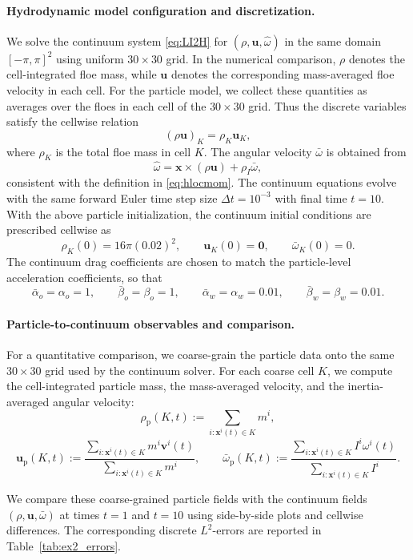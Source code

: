 \documentclass[a4paper,11pt]{article}
\numberwithin{equation}{section}
\theoremstyle{definition}
\newcommand{\bfx}{\boldsymbol{x}}
\newcommand{\bfzr}{\boldsymbol{0}}
\newcommand{\bfv}{\boldsymbol{v}}
\newcommand{\bfuu}{\boldsymbol{u}}
\begin{document}
\paragraph{Hydrodynamic model configuration and discretization.}
We solve the continuum system \eqref{eq:LI2H} for
$(\rho,\bfuu,\hat\omega)$ in the same domain $[-\pi, \pi]^2$ using uniform $30\times 30$ grid. 
In the numerical comparison, $\rho$ denotes the
cell-integrated floe mass, while $\bfuu$ denotes the corresponding
mass-averaged floe velocity in each cell. 
For the particle model, we collect these quantities as averages over the floes in each cell of the $30\times 30$ grid.
Thus the discrete variables satisfy the cellwise relation
\[
(\rho\bfuu)_K = \rho_K \bfuu_K,
\]
where $\rho_K$ is the total floe mass in cell $K$. The angular velocity
$\bar\omega$ is obtained from
\[
\hat\omega = \bfx\times(\rho\bfuu)+\rho_I\bar\omega,
\]
consistent with the definition in \eqref{eq:hlocmom}. The continuum equations
evolve with the same forward Euler time step size $\Delta t=10^{-3}$ with final time $t=10.$
%
With the above particle initialization, the continuum initial conditions are
prescribed cellwise as
\[
\rho_K(0)=16 \pi(0.02)^2,\qquad
\bfuu_K(0)=\bfzr,\qquad
\bar\omega_K(0)=0.
\]
The continuum drag coefficients are chosen to match the particle-level
acceleration coefficients, so that
\[
\bar\alpha_o=\alpha_o=1,\qquad
\bar\beta_o=\beta_o=1,\qquad
\bar\alpha_w=\alpha_w=0.01,\qquad
\bar\beta_w=\beta_w=0.01.
\]

\paragraph{Particle-to-continuum observables and comparison.}
For a quantitative comparison, we coarse-grain the particle data onto the same
$30\times 30$ grid used by the continuum solver. For each coarse cell $K$, we
compute the cell-integrated particle mass, the mass-averaged velocity, and the
inertia-averaged angular velocity:
\[
\rho_{\mathrm{p}}(K,t)
:=\sum_{i: \bfx^i(t)\in K} m^i,
\]
\[
\bfuu_{\mathrm{p}}(K,t)
:=
\frac{\displaystyle\sum_{i: \bfx^i(t)\in K}m^i\bfv^i(t)}
{\displaystyle\sum_{i: \bfx^i(t)\in K}m^i},
\qquad
\bar\omega_{\mathrm{p}}(K,t)
:=
\frac{\displaystyle\sum_{i: \bfx^i(t)\in K}I^i\omega^i(t)}
{\displaystyle\sum_{i: \bfx^i(t)\in K}I^i}.
\]


We compare these coarse-grained particle fields with the continuum fields
$(\rho,\bfuu,\bar\omega)$ at times $t=1$ and $t=10$ using side-by-side plots
and cellwise differences. The corresponding discrete $L^2$-errors are reported
in Table~\ref{tab:ex2_errors}.
\end{document}
